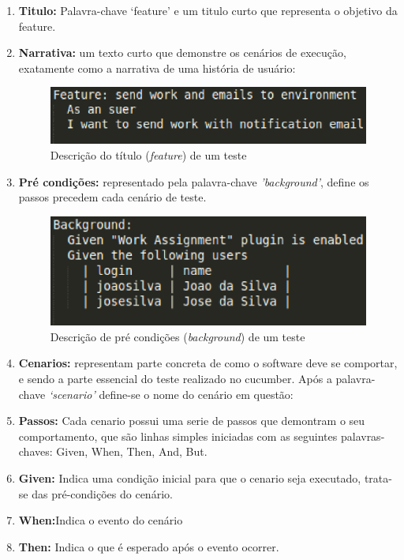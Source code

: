 \begin{enumerate}
\item \textbf{Titulo:} Palavra-chave ‘feature’ e um titulo curto que representa o 
objetivo da feature.
\item \textbf{Narrativa:} um texto curto que demonstre os cenários de execução, 
exatamente como a narrativa de uma história de usuário:

\begin{figure}[!h]
    \centering
    \includegraphics[keepaspectratio=true,scale=0.50]
      {figuras/noosfero_feature2.eps}
    \caption{Descrição do título (\textit{feature}) de um teste}
    \label{nosfero_feature}
\end{figure}

\item \textbf{Pré condições:} representado pela palavra-chave \textit{'background'}, define os passos 
precedem cada cenário de teste.

\begin{figure}[!h]
    \centering
    \includegraphics[keepaspectratio=true,scale=0.50]
      {figuras/noosfero_back.eps}
    \caption{Descrição de pré condições (\textit{background}) de um teste}
    \label{nosfero_feature}
\end{figure}

\item \textbf{Cenarios:} representam parte concreta de como o software deve se 
comportar, e sendo a parte essencial do teste realizado no 
cucumber. Após a palavra-chave \textit{‘scenario’} define-se o nome do cenário em questão:
\item \textbf{Passos:} Cada cenario possui uma serie de passos que demontram o seu 
comportamento, que são linhas simples iniciadas com as seguintes palavras-chaves: 
Given, When, Then, And, But.
\item \textbf{Given:} Indica uma condição inicial para que o cenario seja executado, 
trata-se das pré-condições do cenário.
\item \textbf{When:}Indica o evento do cenário
\item \textbf{Then:} Indica o que é esperado após o evento ocorrer.


\end{enumerate}
